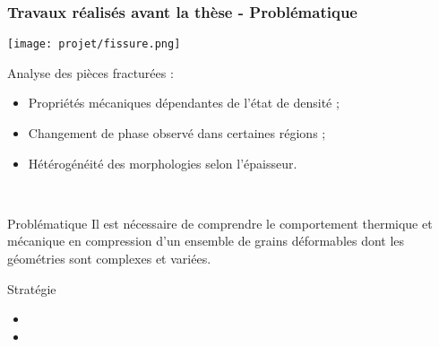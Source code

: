\documentclass[8pt]{beamer}
\begin{document}
\begin{frame}
	\frametitle{Travaux réalisés avant la thèse - Problématique}
	\vfill
	\begin{minipage}[c]{.29\textwidth}\centering
		\texttt{[image: projet/fissure.png]}
	\end{minipage}
	\begin{minipage}[c]{.7\textwidth}
	\begin{block}{Analyse des pièces fracturées :}
		\begin{itemize}[label=$\rightarrow$]
			\item Propriétés mécaniques dépendantes de l'état de densité ;
			\item Changement de phase observé dans certaines régions ;
			\item Hétérogénéité des morphologies selon l'épaisseur.
		\end{itemize}
	\end{block}
	\end{minipage}\\\vfill
	\begin{block}{Problématique}
		Il est nécessaire de comprendre le comportement thermique et mécanique en compression d'un ensemble de grains déformables dont les géométries sont complexes et variées.
	\end{block}\vfill
	\begin{block}{Stratégie}
		\begin{itemize}[label=$\rightarrow$]
			\item {}
			\item {}
		\end{itemize}
	\end{block}\vfill
\end{frame}
\end{document}
